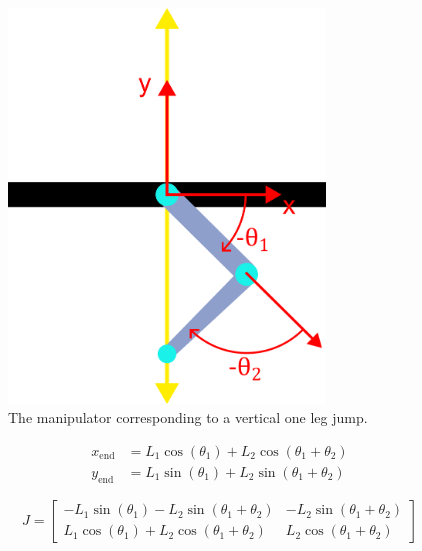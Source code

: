 \begin{figure}[h]
    \centering
    \includegraphics[width=0.75\textwidth]{Images/one_axis_jump.png}
    \caption{The manipulator corresponding to a vertical one leg jump.}
    \label{fig:vertical_manipulator}
\end{figure}

\begin{equation}
    \label{eq:2_link_manipulator}
    \begin{aligned}
        x_{\text{end}} &= L_1 \cos(\theta_1) + L_2 \cos(\theta_1 + \theta_2) \\
        y_{\text{end}} &= L_1 \sin(\theta_1) + L_2 \sin(\theta_1 + \theta_2)
    \end{aligned}
\end{equation}

\begin{equation*}
    \label{eq:jacobian_vertical_jump_leg}
    J = \begin{bmatrix} 
    -L_1 \sin(\theta_1) - L_2 \sin(\theta_1 + \theta_2) & -L_2 \sin(\theta_1 + \theta_2) \\
    L_1 \cos(\theta_1) + L_2 \cos(\theta_1 + \theta_2) & L_2 \cos(\theta_1 + \theta_2)
    \end{bmatrix}
\end{equation*}

